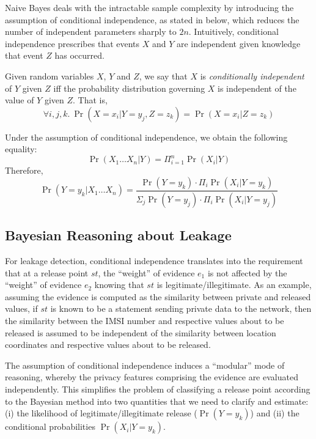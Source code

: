 Naive Bayes deals with the intractable sample complexity by introducing the assumption of conditional independence, as stated in  below, which reduces the number of independent parameters sharply to $2n$. Intuitively, conditional independence prescribes that events $X$ and $Y$ are independent given knowledge that event $Z$ has occurred.

\begin{definition}\label{De:condind} Given random variables $X$, $Y$ and $Z$, we say that $X$ is \emph{conditionally independent} of $Y$ given $Z$ iff the probability distribution governing $X$ is independent of the value of $Y$ given $Z$. That is,
$$
	\forall i,j,k.\ \Pr(X=x_i | Y=y_j, Z=z_k) = \Pr(X = x_i | Z = z_k)
$$
\end{definition}

Under the assumption of conditional independence, we obtain the following equality:
\begin{equation}
	\Pr(X_1 \ldots X_n | Y) = \Pi_{i=1}^{n} \Pr(X_i | Y)
\end{equation}
Therefore,
\begin{equation}\label{Eq:condind}
	\Pr(Y=y_k | X_1 \ldots X_n) = \frac{\Pr(Y=y_k) \cdot \Pi_i \Pr(X_i | Y=y_k)}{\Sigma_j \Pr(Y=y_j) \cdot \Pi_i \Pr(X_i | Y=y_j)}
\end{equation}

\subsection{Bayesian Reasoning about Leakage}

For leakage detection, conditional independence translates into the requirement that at a release point $st$, the ``weight'' of evidence $e_1$ is not affected by the ``weight'' of evidence $e_2$ knowing that $st$ is legitimate/illegitimate. As an example, assuming the evidence is computed as the similarity between private and released values, if $st$ is known to be a statement sending private data to the network, then the similarity between the IMSI number and respective values about to be released is assumed to be independent of the similarity between location coordinates and respective values about to be released.

The assumption of conditional independence induces a ``modular'' mode of reasoning, whereby the privacy features comprising the evidence are evaluated independently.
This simplifies the problem of classifying a release point according to the Bayesian method into two quantities that we need to clarify and estimate: (i) the likelihood of legitimate/illegitimate release ($\Pr(Y=y_k)$) and (ii) the conditional probabilities $\Pr(X_i | Y=y_k)$.












